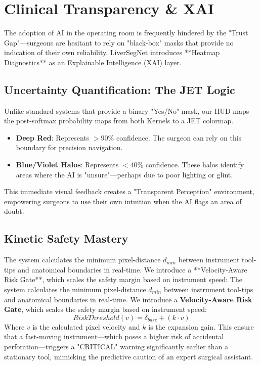 \documentclass[conference]{IEEEtran}
\begin{document}
\section{Clinical Transparency \& XAI}
The adoption of AI in the operating room is frequently hindered by the "Trust Gap"—surgeons are hesitant to rely on "black-box" masks that provide no indication of their own reliability. LiverSegNet introduces **Heatmap Diagnostics** as an Explainable Intelligence (XAI) layer.

\subsection{Uncertainty Quantification: The JET Logic}
Unlike standard systems that provide a binary "Yes/No" mask, our HUD maps the post-softmax probability maps from both Kernels to a JET colormap. 
\begin{itemize}
    \item \textbf{Deep Red}: Represents $>90\%$ confidence. The surgeon can rely on this boundary for precision navigation.
    \item \textbf{Blue/Violet Halos}: Represents $<40\%$ confidence. These halos identify areas where the AI is "unsure"—perhaps due to poor lighting or glint. 
\end{itemize}
This immediate visual feedback creates a "Transparent Perception" environment, empowering surgeons to use their own intuition when the AI flags an area of doubt.

\subsection{Kinetic Safety Mastery}
The system calculates the minimum pixel-distance $d_{min}$ between instrument tool-tips and anatomical boundaries in real-time. We introduce a **Velocity-Aware Risk Gate**, which scales the safety margin based on instrument speed:
The system calculates the minimum pixel-distance $d_{min}$ between instrument tool-tips and anatomical boundaries in real-time. We introduce a \textbf{Velocity-Aware Risk Gate}, which scales the safety margin based on instrument speed:
\begin{equation}
RiskThreshold(v) = \delta_{base} + (k \cdot v)
\end{equation}
Where $v$ is the calculated pixel velocity and $k$ is the expansion gain. This ensure that a fast-moving instrument—which poses a higher risk of accidental perforation—triggers a "CRITICAL" warning significantly earlier than a stationary tool, mimicking the predictive caution of an expert surgical assistant.
\end{document}
